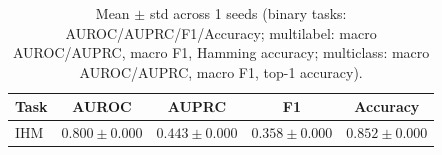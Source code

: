 \begin{table}[h]
\centering
\begin{tabular}{l|cccc}
\hline
Task & AUROC & AUPRC & F1 & Accuracy \\
\hline
IHM & $0.800 \pm 0.000$ & $0.443 \pm 0.000$ & $0.358 \pm 0.000$ & $0.852 \pm 0.000$ \\
\hline
\end{tabular}
\caption{Mean $\pm$ std across 1 seeds (binary tasks: AUROC/AUPRC/F1/Accuracy; multilabel: macro AUROC/AUPRC, macro F1, Hamming accuracy; multiclass: macro AUROC/AUPRC, macro F1, top-1 accuracy).}
\end{table}

